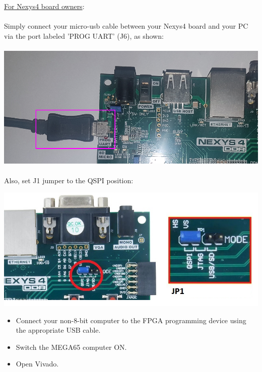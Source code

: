\begin{tcolorbox}[colback=white,coltext=black]
\underline{For Nexys4 board owners}: \\
\\
  Simply connect your micro-usb cable between your Nexys4 board and your PC via the port labeled 'PROG UART' (J6), as shown: \\
\\
\includegraphics[width=\linewidth]{images/nexys4_comms.png}
\\
\\
Also, set J1 jumper to the QSPI position:
\\
\begin{center}
  \includegraphics[width=0.8\linewidth]{images/nexys4_j2.png}
\end{center}

\end{tcolorbox}

\begin{itemize}
  \item Connect your non-8-bit computer to the FPGA programming device using the appropriate USB cable.
  \item Switch the MEGA65 computer ON.
  \item Open Vivado.
\end{itemize}


